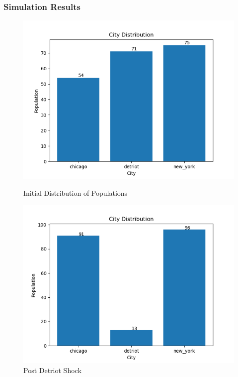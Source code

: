 \documentclass[serif, 9pt, aspectratio=32]{beamer}
\begin{document}
\begin{frame}
    \centering
    \frametitle{Simulation Results}
    \begin{figure}[h]
        \begin{minipage}{0.5\textwidth}
            \centering
            \includegraphics[width=\textwidth]{../simulations/graphs/city_pop.png}
            \caption{Initial Distribution of Populations}
            \label{city_pop}
        \end{minipage}%
        \begin{minipage}{0.5\textwidth}
            \centering
            \includegraphics[width=\textwidth]{../simulations/graphs/c_shock.png}
            \caption{Post Detriot Shock}
            \label{c_shock}
        \end{minipage}
    \end{figure}
\end{frame}
\end{document}
